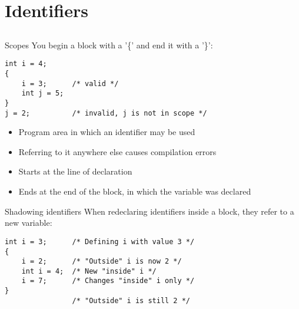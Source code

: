 \section{Identifiers}
\subsection{}

\begin{frame}[fragile]{Scopes}
	You begin a block with a '\{' and end it with a '\}':
	\begin{lstlisting}
int i = 4;
{
	i = 3;		/* valid */
	int j = 5;
}
j = 2;			/* invalid, j is not in scope */
\end{lstlisting}
	\begin{itemize}
		\item Program area in which an identifier may be used
		\item Referring to it anywhere else causes compilation errors
		\item Starts at the line of declaration
		\item Ends at the end of the block, in which the variable was declared
	\end{itemize}
	
\end{frame}

\begin{frame}[fragile]{Shadowing identifiers}
	When redeclaring identifiers inside a block, they refer to a new variable:
	\begin{lstlisting}
int i = 3;		/* Defining i with value 3 */
{
	i = 2;		/* "Outside" i is now 2 */
	int i = 4;	/* New "inside" i */
	i = 7;		/* Changes "inside" i only */
}
				/* "Outside" i is still 2 */
\end{lstlisting}\ \\
	
\end{frame}

